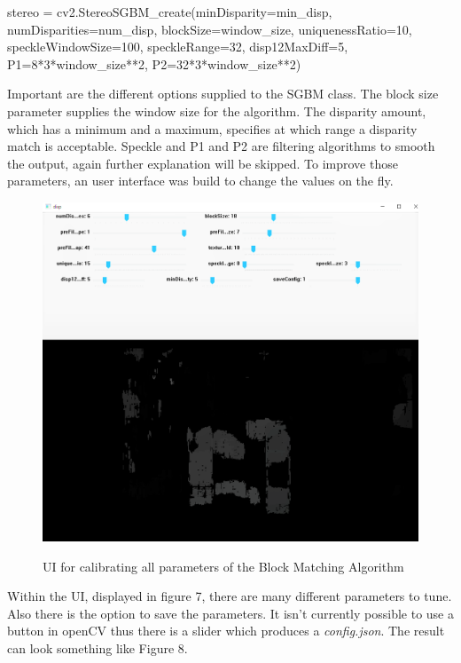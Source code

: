 \documentclass[journal,onecolumn]{IEEEtran}
\begin{document}
\begin{python}
stereo = cv2.StereoSGBM_create(minDisparity=min_disp,
			       numDisparities=num_disp,
			       blockSize=window_size,
			       uniquenessRatio=10,
			       speckleWindowSize=100,
			       speckleRange=32,
			       disp12MaxDiff=5,
			       P1=8*3*window_size**2,
			       P2=32*3*window_size**2)
\end{python}
Important are the different options supplied to the SGBM class. The block size parameter supplies the window size for the algorithm. The disparity amount, which has a minimum and a maximum, specifies at which range a disparity match is acceptable. Speckle and P1 and P2 are filtering algorithms to smooth the output\cite{stereoSGBM}, again further explanation will be skipped.
To improve those parameters, an user interface was build to change the values on the fly.
\begin{figure}[H]
	\centering
	\includegraphics[scale=0.4]{calibrateUI.png}
	\label{UI}
	\captionsetup{justification=centering}
	\caption{UI for calibrating all parameters of the Block Matching Algorithm}
\end{figure}
\noindent
Within the UI, displayed in figure 7, there are many different parameters to tune. Also there is the option to save the parameters. It isn't currently possible to use a button in openCV thus there is a slider which produces a \emph{config.json}. The result can look something like Figure 8.
\end{document}
